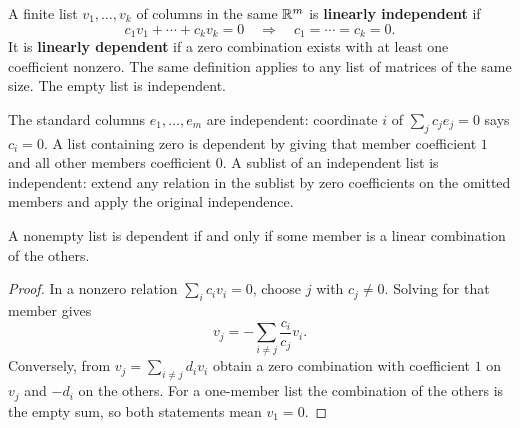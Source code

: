A finite list \(v_1,\ldots,v_k\) of columns in the same \(\mathbb R^m\) is
\textbf{linearly independent} if
\[
c_1v_1+\cdots+c_kv_k=0\quad\Longrightarrow\quad c_1=\cdots=c_k=0.
\]
It is \textbf{linearly dependent} if a zero combination exists with at
least one coefficient nonzero. The same definition applies to any list
of matrices of the same size. The empty list is independent.

The standard columns \(e_1,\ldots,e_m\) are independent: coordinate
\(i\) of \(\sum_jc_je_j=0\) says \(c_i=0\). A list containing zero
is dependent by giving that member coefficient \(1\) and all other
members coefficient \(0\). A sublist of an independent list is
independent: extend any relation in the sublist by zero coefficients
on the omitted members and apply the original independence.

\begin{proposition}\label{prop:01:redundancy}
A nonempty list is dependent if and only if some member is a linear
combination of the others.
\end{proposition}
\begin{proof}
In a nonzero relation \(\sum_i c_iv_i=0\), choose \(j\) with \(c_j\ne0\).
Solving for that member gives
\[
v_j=-\sum_{i\ne j}\frac{c_i}{c_j}v_i.
\]
Conversely, from \(v_j=\sum_{i\ne j}d_iv_i\) obtain a zero combination
with coefficient \(1\) on \(v_j\) and \(-d_i\) on the others.
For a one-member list the combination of the others is the empty sum,
so both statements mean \(v_1=0\).
\end{proof}

